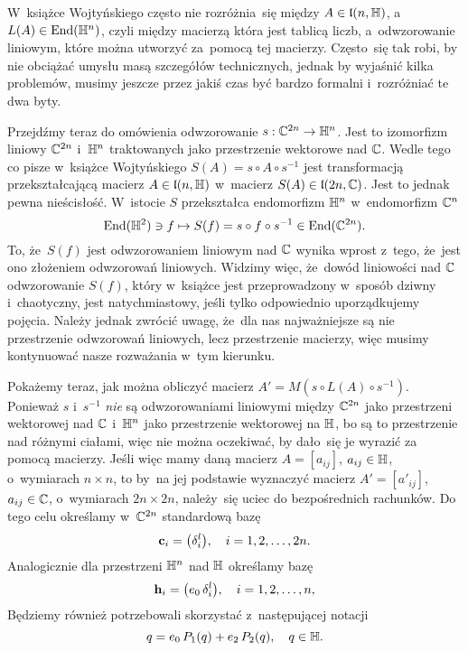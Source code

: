 \documentclass[a4paper,11pt]{article}
\begin{document}
W~książce Wojtyńskiego często nie rozróżnia~się między
$A \in \mathfrak{l}( n, \mathbb{H} )$, a~$L( A ) \in \mathrm{End}( \mathbb{H}^{ n } )$, czyli między
macierzą która jest tablicą liczb, a~odwzorowanie liniowym, które można
utworzyć za~pomocą tej macierzy. Często~się tak robi, by nie obciążać
umysłu masą szczegółów technicznych, jednak by wyjaśnić kilka problemów,
musimy jeszcze przez jakiś czas być bardzo formalni i~rozróżniać te dwa
byty.

Przejdźmy teraz do omówienia odwzorowanie $s : \mathbb{C}^{ 2n } \to \mathbb{H}^{ n }$.
Jest to izomorfizm liniowy $\mathbb{C}^{ 2n }$ i~$\mathbb{H}^{ n }$ traktowanych
jako przestrzenie wektorowe nad $\mathbb{C}$. Wedle tego co pisze w~książce
Wojtyńskiego $S( A ) = s \circ A \circ s^{ -1 }$ jest transformacją przekształcającą
macierz $A \in \mathfrak{l}( n, \mathbb{H} )$ w~macierz $S( A ) \in \mathfrak{l}( 2n, \mathbb{C} )$.
Jest to jednak pewna nieścisłość. W~istocie $S$ przekształca endomorfizm
$\mathbb{H}^{ n }$ w~endomorfizm $\mathbb{C}^{ n }$
\begin{equation}
  \label{eq:Wojtynski-87}
  \mathrm{End}( \mathbb{H}^{ 2 } ) \ni f \mapsto S( f ) = s \circ f \circ s^{ -1 } \in \mathrm{End}( \mathbb{C}^{ 2n } ).
\end{equation}
To, że~$S( f )$ jest odwzorowaniem liniowym nad $\mathbb{C}$ wynika wprost
z~tego, że~jest ono złożeniem odwzorowań liniowych. Widzimy więc, że~dowód
liniowości nad $\mathbb{C}$ odwzorowanie $S( f )$, który w~książce jest
przeprowadzony w~sposób dziwny i~chaotyczny, jest natychmiastowy, jeśli
tylko odpowiednio uporządkujemy pojęcia. Należy jednak zwrócić uwagę,
że~dla nas najważniejsze są nie przestrzenie odwzorowań liniowych, lecz
przestrzenie macierzy, więc musimy kontynuować nasze rozważania w~tym
kierunku.

Pokażemy teraz, jak można obliczyć macierz
$A' = M\!\left( s \circ L( A ) \circ s^{ -1 } \right)$. Ponieważ $s$ i~$s^{ -1 }$
\textit{nie} są odwzorowaniami liniowymi między $\mathbb{C}^{ 2n }$ jako
przestrzeni wektorowej nad $\mathbb{C}$ i~$\mathbb{H}^{ n }$ jako przestrzenie
wektorowej na $\mathbb{H}$, bo są to przestrzenie nad różnymi ciałami, więc nie
można oczekiwać, by dało~się je wyrazić za pomocą macierzy. Jeśli więc mamy
daną macierz $A = [ a_{ i j } ]$, $a_{ i j } \in \mathbb{H}$, o~wymiarach $n \times n$, to
by~na jej podstawie wyznaczyć macierz $A' = [ a'_{ i j } ]$,
$a_{ i j } \in \mathbb{C}$, o~wymiarach $2n \times 2n$, należy~się uciec do bezpośrednich
rachunków. Do tego celu określamy w~$\mathbb{C}^{ 2n }$ standardową bazę
\begin{equation}
  \label{eq:Wojtynski-88}
  \mathbf{c}_{ i } = \big( \delta^{ l }_{ i } \big), \quad
  i = 1, 2, \ldots, 2n.
\end{equation}
Analogicznie dla przestrzeni $\mathbb{H}^{ n }$ nad $\mathbb{H}$ określamy bazę
\begin{equation}
  \label{eq:Wojtynski-89}
  \mathbf{h}_{ i } = \big( e_{ 0 } \, \delta^{ l }_{ i } \big), \quad
  i = 1, 2, \ldots, n,
\end{equation}
Będziemy również potrzebowali skorzystać z~następującej notacji
\begin{equation}
  \label{eq:Wojtynski-90}
  q = e_{ 0 } \, P_{ 1 }( q ) + e_{ 2 } \, P_{ 2 }( q ), \quad
  q \in \mathbb{H}.
\end{equation}
\end{document}
